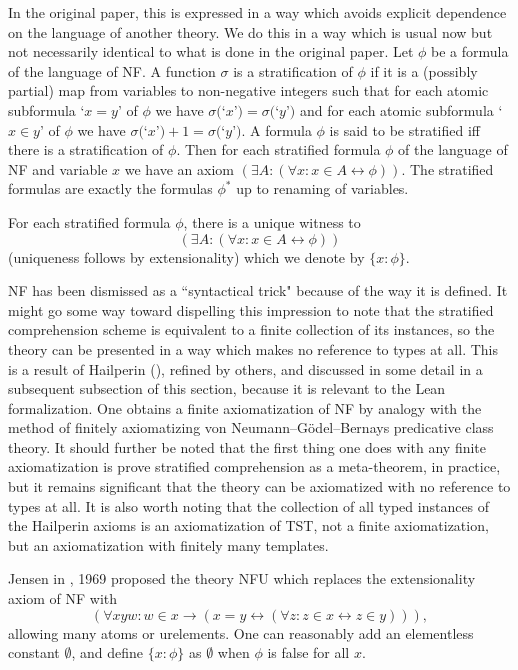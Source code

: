 \documentclass{article}
\theoremstyle{definition}
\theoremstyle{remark}
\begin{document}
{In the original paper, this is expressed in a way which avoids explicit dependence on the language of another theory.  We do this in a way which is usual now but not necessarily identical to what is done in the original paper.  Let $\phi$ be a formula of the language of
NF.    A function $\sigma$ is a stratification of $\phi$ if it is a (possibly partial) map from variables to non-negative integers such that for each atomic subformula
`$x=y$'  of $\phi$ we have $\sigma($`$x$'$)=\sigma($`$y$'$)$ and for each atomic subformula `$x \in y$' of $\phi$ we have $\sigma($`$x$'$)+1 = \sigma($`$y$'$)$.
A formula $\phi$ is said to be stratified iff there is a stratification of $\phi$.  Then for each stratified formula $\phi$ of the language of NF and variable $x$ we have an axiom $(\exists A:(\forall x:x \in A \leftrightarrow \phi))$.  The stratified formulas are exactly the formulas $\phi^*$ up to renaming of variables.

For each stratified formula $\phi$, there is a unique witness to $$(\exists A:(\forall x:x \in A \leftrightarrow \phi))$$ (uniqueness follows by extensionality) which we denote by $\{x:\phi\}$.

NF has been dismissed as a ``syntactical trick" because of the way it is defined.  It might go some way toward dispelling this impression to note that the stratified comprehension scheme is equivalent to a finite collection of its instances, so the theory can be presented in a way which makes no reference to types at all.  This is a result of Hailperin (\cite{hailperin}), refined by others, and discussed in some detail in a subsequent subsection of this section, because it is relevant to the Lean formalization.  One obtains a finite axiomatization of NF by analogy with the method of finitely axiomatizing von Neumann--G\"odel--Bernays predicative class theory.  It should further be noted that the first thing one does with any finite axiomatization is prove stratified comprehension as a meta-theorem, in practice, but it remains significant that the theory can be axiomatized with no reference to types at all.  It is also worth noting that the collection of all typed instances of the Hailperin axioms is an axiomatization of TST, not a finite axiomatization, but an axiomatization with finitely many templates.



Jensen in \cite{nfu}, 1969 proposed the theory NFU which replaces the extensionality axiom of NF with $$(\forall xyw:w \in x \rightarrow (x=y \leftrightarrow (\forall z:z \in x \leftrightarrow z\in y))),$$  allowing many atoms or urelements.  One can reasonably add an elementless constant $\emptyset$, and define $\{x:\phi\}$ as $\emptyset$ when $\phi$ is false for all $x$.

}
\end{document}
